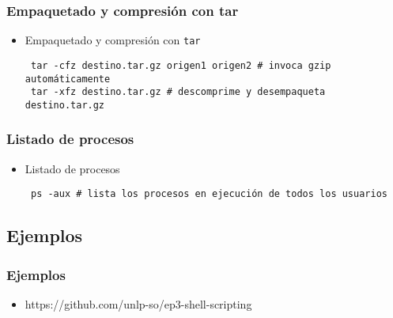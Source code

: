 \begin{frame}[fragile]
  \frametitle{Empaquetado y compresión con tar}
  \begin{itemize}
    \item Empaquetado y compresión con \texttt{tar}
   \begin{lstlisting}
 tar -cfz destino.tar.gz origen1 origen2 # invoca gzip automáticamente
 tar -xfz destino.tar.gz # descomprime y desempaqueta destino.tar.gz
   \end{lstlisting}
  \end{itemize}
\end{frame}

\begin{frame}[fragile]
  \frametitle{Listado de procesos}
  \begin{itemize}
    \item Listado de procesos
   \begin{lstlisting}
 ps -aux # lista los procesos en ejecución de todos los usuarios
   \end{lstlisting}
  \end{itemize}
\end{frame}

\subsection{Ejemplos}

\begin{frame}
  \frametitle{Ejemplos}
  \begin{itemize}
    \item https://github.com/unlp-so/ep3-shell-scripting
  \end{itemize}
\end{frame}

